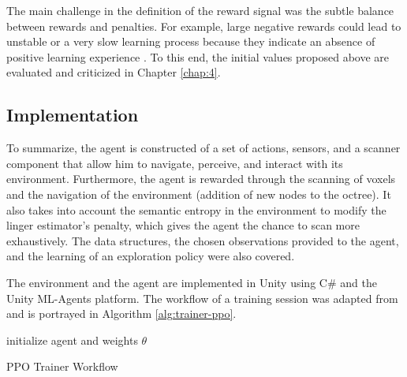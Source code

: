 The main challenge in the definition of the reward signal was the subtle balance between rewards and penalties. For example, large negative rewards could lead to unstable or a very slow learning process because they indicate an absence of positive learning experience \cite{sutton2018reinforcement}. To this end, the initial values proposed above are evaluated and criticized in Chapter \ref{chap:4}.



\subsection{Implementation}
To summarize, the agent is constructed of a set of actions, sensors, and a scanner component that allow him to navigate, perceive, and interact with its environment. Furthermore, the agent is rewarded through the scanning of voxels and the navigation of the environment (addition of new nodes to the octree). It also takes into account the semantic entropy in the environment to modify the linger estimator's penalty, which gives the agent the chance to scan more exhaustively. The data structures, the chosen observations provided to the agent, and the learning of an exploration policy were also covered. 

The environment and the agent are implemented in Unity using C\# and the Unity ML-Agents platform. 
The workflow of a training session was adapted from \cite{eriksson2021deep} and is portrayed in Algorithm \ref{alg:trainer-ppo}.

{\centering
\begin{minipage}{.8\linewidth}
    \begin{algorithm}[H]
        initialize agent and weights $\theta$\;
      
        \caption{PPO Trainer Workflow} \label{alg:trainer-ppo}
    \end{algorithm}
\end{minipage}
\par
}



